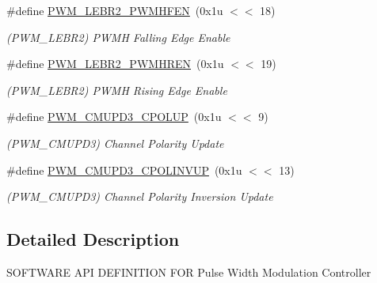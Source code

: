 \begin{DoxyCompactItemize}
\#define \mbox{\hyperlink{group__SAMS70__PWM_gae015ab5851301e4bfc757130818ae196}{P\+W\+M\+\_\+\+L\+E\+B\+R2\+\_\+\+P\+W\+M\+H\+F\+EN}}~(0x1u $<$$<$ 18)
\begin{DoxyCompactList}\small\item\em (P\+W\+M\+\_\+\+L\+E\+B\+R2) P\+W\+MH Falling Edge Enable \end{DoxyCompactList}\item 
\mbox{\label{group__SAMS70__PWM_ga33ec5866d3fca1b57c1d71a4ec7ced29}} 
\#define \mbox{\hyperlink{group__SAMS70__PWM_ga33ec5866d3fca1b57c1d71a4ec7ced29}{P\+W\+M\+\_\+\+L\+E\+B\+R2\+\_\+\+P\+W\+M\+H\+R\+EN}}~(0x1u $<$$<$ 19)
\begin{DoxyCompactList}\small\item\em (P\+W\+M\+\_\+\+L\+E\+B\+R2) P\+W\+MH Rising Edge Enable \end{DoxyCompactList}\item 
\mbox{\label{group__SAMS70__PWM_ga14cfa3eca93d568658b9f59641473437}} 
\#define \mbox{\hyperlink{group__SAMS70__PWM_ga14cfa3eca93d568658b9f59641473437}{P\+W\+M\+\_\+\+C\+M\+U\+P\+D3\+\_\+\+C\+P\+O\+L\+UP}}~(0x1u $<$$<$ 9)
\begin{DoxyCompactList}\small\item\em (P\+W\+M\+\_\+\+C\+M\+U\+P\+D3) Channel Polarity Update \end{DoxyCompactList}\item 
\mbox{\label{group__SAMS70__PWM_gae2999f989a5f1c10f4662d070919f8b5}} 
\#define \mbox{\hyperlink{group__SAMS70__PWM_gae2999f989a5f1c10f4662d070919f8b5}{P\+W\+M\+\_\+\+C\+M\+U\+P\+D3\+\_\+\+C\+P\+O\+L\+I\+N\+V\+UP}}~(0x1u $<$$<$ 13)
\begin{DoxyCompactList}\small\item\em (P\+W\+M\+\_\+\+C\+M\+U\+P\+D3) Channel Polarity Inversion Update \end{DoxyCompactList}\end{DoxyCompactItemize}


\subsection{Detailed Description}
S\+O\+F\+T\+W\+A\+RE A\+PI D\+E\+F\+I\+N\+I\+T\+I\+ON F\+OR Pulse Width Modulation Controller 